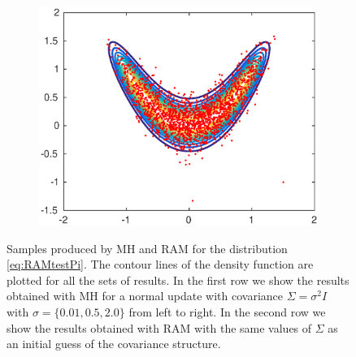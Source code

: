 \begin{figure}[t]
\begin{subfigure}{0.32\linewidth}
		\includegraphics[width=1\linewidth]{plots/MHvsRAM/RAM_big}
	\end{subfigure}
	\caption{Samples produced by MH and RAM for the distribution \eqref{eq:RAMtestPi}. The contour lines of the density function are plotted for all the sets of results. In the first row we show the results obtained with MH for a normal update with covariance $\Sigma = \sigma^2 I $ with $\sigma = \{0.01, 0.5, 2.0\}$ from left to right. In the second row we show the results obtained with RAM with the same values of $\Sigma$ as an initial guess of the covariance structure. }
	\label{fig:RAMexample}
\end{figure}